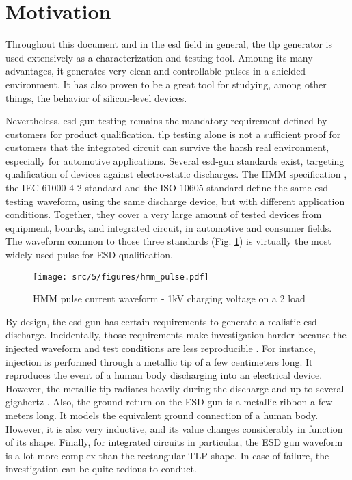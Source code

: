 \section{Motivation}

Throughout this document and in the \gls{esd} field in general, the \gls{tlp} generator is used extensively as a characterization and testing tool.
Amoung its many advantages, it generates very clean and controllable pulses in a shielded environment.
It has also proven to be a great tool for studying, among other things, the behavior of silicon-level devices.

Nevertheless, \gls{esd-gun} testing remains the mandatory requirement defined by customers for product qualification.
\gls{tlp} testing alone is not a sufficient proof for customers that the integrated circuit can survive the harsh real environment, especially for automotive applications.
Several \gls{esd-gun} standards exist, targeting qualification of devices against electro-static discharges.
The HMM specification \cite{hmm}, the IEC 61000-4-2 standard \cite{iec61000-4-2} and the ISO 10605 standard \cite{iso10605} define the same \gls{esd} testing waveform, using the same discharge device, but with different application conditions.
Together, they cover a very large amount of tested devices from equipment, boards, and integrated circuit, in automotive and consumer fields.
The waveform common to those three standards (Fig. \ref{fig:hmm-waveform}) is virtually the most widely used pulse for ESD qualification.

\begin{figure}[!h]
  \centering
  \texttt{[image: src/5/figures/hmm\_pulse.pdf]}
  \caption{HMM pulse current waveform - 1kV charging voltage on a 2\textOmega{} load}
  \label{fig:hmm-waveform}
\end{figure}

By design, the \gls{esd-gun} has certain requirements to generate a realistic \gls{esd} discharge.
Incidentally, those requirements make investigation harder because the injected waveform and test conditions are less reproducible \cite{hmm-round-robin-study}.
For instance, injection is performed through a metallic tip of a few centimeters long.
It reproduces the event of a human body discharging into an electrical device.
However, the metallic tip radiates heavily during the discharge and up to several gigahertz \cite{system-level-esd-failure-variation}.
Also, the ground return on the ESD gun is a metallic ribbon a few meters long.
It models the equivalent ground connection of a human body.
However, it is also very inductive, and its value changes considerably in function of its shape.
Finally, for integrated circuits in particular, the ESD gun waveform is a lot more complex than the rectangular TLP shape.
In case of failure, the investigation can be quite tedious to conduct.

